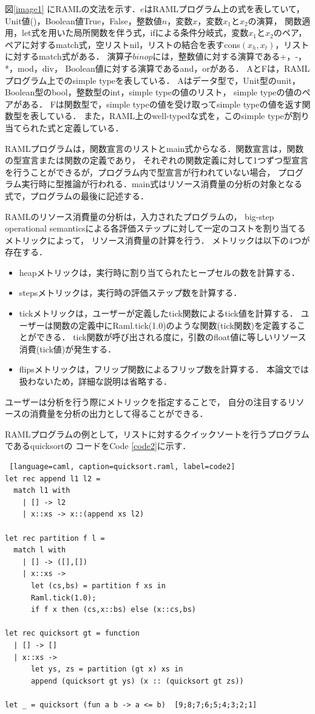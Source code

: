 \documentclass{kuisthesis}
\begin{document}
図\ref{image1} にRAMLの文法を示す．$e$はRAMLプログラム上の式を表していて，
Unit値()，Boolean値True，False，整数値$n$，変数$x$，変数$x_1$と$x_2$の演算，
関数適用，let式を用いた局所関数を伴う式，ifによる条件分岐式，変数$x_1$と$x_2$のペア，
ペアに対するmatch式，空リストnil，リストの結合を表すcons$(x_h,x_t)$，リストに対するmatch式がある．
演算子$binop$には，整数値に対する演算である+，-，*，mod，div，
Boolean値に対する演算であるand，orがある．
AとFは，RAMLプログラム上でのsimple typeを表している．
Aはデータ型で，Unit型のunit，Boolean型のbool，整数型のint，simple typeの値のリスト，
simple typeの値のペアがある．
Fは関数型で，simple typeの値を受け取ってsimple typeの値を返す関数型を表している．
また，RAML上のwell-typedな式を，このsimple typeが割り当てられた式と定義している．

RAMLプログラムは，関数宣言のリストとmain式からなる．関数宣言は，関数の型宣言または関数の定義であり，
それぞれの関数定義に対して1つずつ型宣言を行うことができるが，プログラム内で型宣言が行われていない場合，
プログラム実行時に型推論が行われる．main式はリソース消費量の分析の対象となる式で，プログラムの最後に記述する．


RAMLのリソース消費量の分析は，入力されたプログラムの，
big-step operational semanticsによる各評価ステップに対して一定のコストを割り当てるメトリックによって，
リソース消費量の計算を行う．
メトリックは以下の4つが存在する．
\begin{itemize}
  \item heapメトリックは，実行時に割り当てられたヒープセルの数を計算する．
  \item stepsメトリックは，実行時の評価ステップ数を計算する．
  \item tickメトリックは，ユーザーが定義したtick関数によるtick値を計算する．
  ユーザーは関数の定義中にRaml.tick(1.0)のような関数(tick関数)を定義することができる．
  tick関数が呼び出される度に，引数のfloat値に等しいリソース消費(tick値)が発生する．
  \item flipsメトリックは，フリップ関数によるフリップ数を計算する．
  本論文では扱わないため，詳細な説明は省略する．
\end{itemize}

ユーザーは分析を行う際にメトリックを指定することで，
自分の注目するリソースの消費量を分析の出力として得ることができる．

RAMLプログラムの例として，リストに対するクイックソートを行うプログラムであるquicksortの
コードをCode \ref{code2}に示す．
\\

\begin{lstlisting} [language=caml, caption=quicksort.raml, label=code2]
let rec append l1 l2 =
  match l1 with
    | [] -> l2
    | x::xs -> x::(append xs l2)

let rec partition f l =
  match l with
    | [] -> ([],[])
    | x::xs ->
      let (cs,bs) = partition f xs in
      Raml.tick(1.0);
      if f x then (cs,x::bs) else (x::cs,bs)

let rec quicksort gt = function
  | [] -> []
  | x::xs ->
      let ys, zs = partition (gt x) xs in
      append (quicksort gt ys) (x :: (quicksort gt zs))

let _ = quicksort (fun a b -> a <= b)  [9;8;7;6;5;4;3;2;1]
\end{lstlisting}
\end{document}
